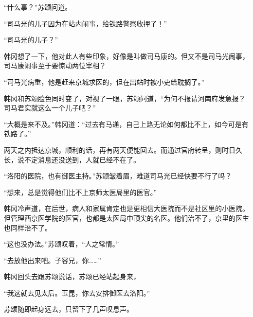 “什么事？”苏颂问道。

“司马光的儿子因为在站内闹事，给铁路警察收押了！”

“司马光的儿子？”

韩冈想了一下，他对此人有些印象，好像是叫做司马康的。但又不是司马光闹事，司马康闹事至于要惊动两位宰相？

“司马光病重，他是赶来京城求医的，但在出站时被小吏给耽搁了。”

韩冈和苏颂脸色同时变了，对视了一眼，苏颂问道，“为何不报请河南府发急报？司马君实就这么一个儿子吧？”

“大概是来不及。”韩冈道：“过去有马递，自己上路无论如何都比不上，如今可是有铁路了。”

两天之内抵达京城，顺利的话，再有两天便能回去。而通过官府转呈，则时日久长，说不定消息还没送到，人就已经不在了。

“洛阳的医院，也有御医主持。”苏颂皱着眉，难道司马光已经快要不行了吗？

“想来，总是觉得他们比不上京师太医局里的医官。”

韩冈冷声道，在后世，病人和家属肯定也是更相信大医院而不是社区里的小医院。但管理西京医学院的医官，也都是太医局中顶尖的名医。他们治不了，京里的医生也同样治不了。

“这也没办法。”苏颂叹着，“人之常情。”

“去放他出来吧。子容兄，你……”

韩冈回头去跟苏颂说话，苏颂已经站起身来，

“我这就去见太后。玉昆，你去安排御医去洛阳。”

苏颂随即起身远去，只留下了几声叹息声。